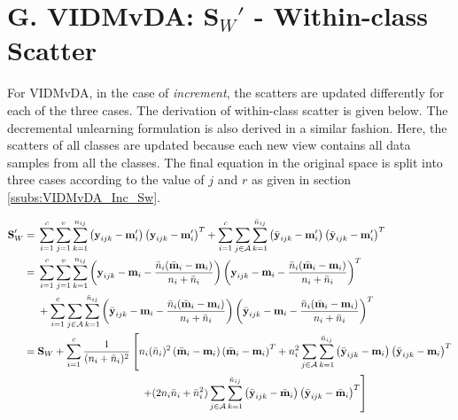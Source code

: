 \section*{G. VIDMvDA: $\textbf{S}_W'$ - Within-class Scatter}
\label{proof:VIDMvDA_Sjr}
For VIDMvDA, in the case of \textit{increment}, the scatters are updated differently for each of the three cases. The derivation of within-class scatter is given below. The decremental unlearning formulation is also derived in a similar fashion. Here, the scatters of all classes are updated because each new view contains all data samples from all the classes. The final equation in the original space is split into three cases according to the value of $j$ and $r$ as given in section \ref{ssubs:VIDMvDA_Inc_Sw}.

\begin{equation*}
\begin{split}
\textbf{S}_W' = \; & \sum_{i=1}^{c} \sum_{j=1}^{v} \sum_{k=1}^{n_{ij}} \left( \textbf{y}_{ijk} - \textbf{m}_i' \right) \left( \textbf{y}_{ijk} - \textbf{m}_i' \right)^T + \sum_{i=1}^{c} \sum_{j \in \mathcal{A}} \sum_{k=1}^{\bar{n}_{ij}} \left( \bar{\textbf{y}}_{ijk} - \textbf{m}_i' \right) \left( \bar{\textbf{y}}_{ijk} - \textbf{m}_i' \right)^T
\\
= \; & \sum_{i=1}^{c} \sum_{j=1}^{v} \sum_{k=1}^{n_{ij}} \left( \textbf{y}_{ijk} - \textbf{m}_i - \frac{\bar{n}_i (\bar{\textbf{m}}_i-\textbf{m}_i )}{n_i + \bar{n}_i} \right) \left( \textbf{y}_{ijk} - \textbf{m}_i - \frac{\bar{n}_i (\bar{\textbf{m}}_i-\textbf{m}_i )}{n_i + \bar{n}_i} \right)^T
\\
& + \sum_{i=1}^{c} \sum_{j \in \mathcal{A}} \sum_{k=1}^{\bar{n}_{ij}} \left( \bar{\textbf{y}}_{ijk} - \textbf{m}_i - \frac{\bar{n}_i (\bar{\textbf{m}}_i-\textbf{m}_i )}{n_i + \bar{n}_i} \right) \left( \bar{\textbf{y}}_{ijk} - \textbf{m}_i - \frac{\bar{n}_i (\bar{\textbf{m}}_i-\textbf{m}_i )}{n_i + \bar{n}_i} \right)^T
\\
= \; & \textbf{S}_W + \sum_{i=1}^{c} \frac{1}{(n_i + \bar{n}_i)^2} \left[ n_i (\bar{n}_i)^2 \left( \bar{\textbf{m}}_i -\textbf{m}_i \right) \left( \bar{\textbf{m}}_i -\textbf{m}_i \right)^T + n_i^2 \sum_{j \in \mathcal{A}} \sum_{k=1}^{\bar{n}_{ij}} \left( \bar{\textbf{y}}_{ijk} - \textbf{m}_i \right) \left( \bar{\textbf{y}}_{ijk} - \textbf{m}_i \right)^T \right.
\\
& \left. \hspace{3.5cm} + (2 n_i \bar{n}_i + \bar{n}_i^2) \sum_{j \in \mathcal{A}} \sum_{k=1}^{\bar{n}_{ij}} \left( \bar{\textbf{y}}_{ijk} - \bar{\textbf{m}}_i \right) \left( \bar{\textbf{y}}_{ijk} - \bar{\textbf{m}}_i \right)^T \right]

\end{split}
\end{equation*}
